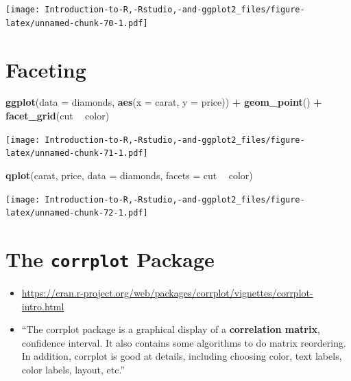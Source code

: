 \documentclass[]{book}
\newenvironment{Shaded}{\begin{snugshade}}{\end{snugshade}}
\newcommand{\DataTypeTok}[1]{\textcolor[rgb]{0.13,0.29,0.53}{#1}}
\newcommand{\KeywordTok}[1]{\textcolor[rgb]{0.13,0.29,0.53}{\textbf{#1}}}
\newcommand{\NormalTok}[1]{#1}
\newcommand{\OperatorTok}[1]{\textcolor[rgb]{0.81,0.36,0.00}{\textbf{#1}}}
\newcommand{\StringTok}[1]{\textcolor[rgb]{0.31,0.60,0.02}{#1}}
\providecommand{\tightlist}{%
  \setlength{\itemsep}{0pt}\setlength{\parskip}{0pt}}
\begin{document}
\texttt{[image: Introduction-to-R,-Rstudio,-and-ggplot2\_files/figure-latex/unnamed-chunk-70-1.pdf]}

\hypertarget{faceting}{%
\section{Faceting}\label{faceting}}

\begin{Shaded}
\begin{Highlighting}[]
\KeywordTok{ggplot}\NormalTok{(}\DataTypeTok{data =}\NormalTok{ diamonds, }\KeywordTok{aes}\NormalTok{(}\DataTypeTok{x =}\NormalTok{ carat, }\DataTypeTok{y =}\NormalTok{ price)) }\OperatorTok{+}\StringTok{ }\KeywordTok{geom_point}\NormalTok{() }\OperatorTok{+}\StringTok{ }\KeywordTok{facet_grid}\NormalTok{(cut }\OperatorTok{~}\StringTok{ }\NormalTok{color)}
\end{Highlighting}
\end{Shaded}

\texttt{[image: Introduction-to-R,-Rstudio,-and-ggplot2\_files/figure-latex/unnamed-chunk-71-1.pdf]}

\begin{Shaded}
\begin{Highlighting}[]
\KeywordTok{qplot}\NormalTok{(carat, price, }\DataTypeTok{data =}\NormalTok{ diamonds, }\DataTypeTok{facets =}\NormalTok{ cut }\OperatorTok{~}\StringTok{ }\NormalTok{color)}
\end{Highlighting}
\end{Shaded}

\texttt{[image: Introduction-to-R,-Rstudio,-and-ggplot2\_files/figure-latex/unnamed-chunk-72-1.pdf]}

\hypertarget{the-corrplot-package}{%
\section{\texorpdfstring{The \texttt{corrplot} Package}{The corrplot Package}}\label{the-corrplot-package}}

\begin{itemize}
\tightlist
\item
  \url{https://cran.r-project.org/web/packages/corrplot/vignettes/corrplot-intro.html}
\item
  ``The corrplot package is a graphical display of a \textbf{correlation matrix}, confidence interval. It also contains some algorithms to do matrix reordering. In addition, corrplot is good at details, including choosing color, text labels, color labels, layout, etc.''
\end{itemize}
\end{document}
